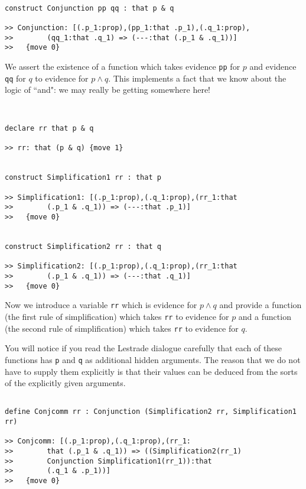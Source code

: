 \documentclass[12pt]{article}
\begin{document}
\begin{verbatim}

construct Conjunction pp qq : that p & q

>> Conjunction: [(.p_1:prop),(pp_1:that .p_1),(.q_1:prop),
>>        (qq_1:that .q_1) => (---:that (.p_1 & .q_1))]
>>   {move 0}

\end{verbatim}

We assert the existence of a function which takes evidence {\tt pp} for $p$ and evidence {\tt qq} for $q$ to evidence for $p \wedge q$.  This implements a fact that we know about the logic of ``and":  we may really be getting somewhere here!

\begin{verbatim}


declare rr that p & q

>> rr: that (p & q) {move 1}


construct Simplification1 rr : that p

>> Simplification1: [(.p_1:prop),(.q_1:prop),(rr_1:that 
>>        (.p_1 & .q_1)) => (---:that .p_1)]
>>   {move 0}


construct Simplification2 rr : that q

>> Simplification2: [(.p_1:prop),(.q_1:prop),(rr_1:that 
>>        (.p_1 & .q_1)) => (---:that .q_1)]
>>   {move 0}

\end{verbatim}

Now we introduce a variable {\tt rr} which is evidence for $p \wedge q$ and provide a function (the first rule of simplification) which takes {\tt rr}
to evidence for $p$ and a function (the second rule of simplification) which takes {\tt rr} to evidence for $q$.

You will notice if you read the Lestrade dialogue carefully that each of these functions has {\tt p} and {\tt q} as additional hidden arguments.
The reason that we do not have to supply them explicitly is that their values can be deduced from the sorts of the explicitly given arguments.

\begin{verbatim}

define Conjcomm rr : Conjunction (Simplification2 rr, Simplification1 rr)

>> Conjcomm: [(.p_1:prop),(.q_1:prop),(rr_1:
>>        that (.p_1 & .q_1)) => ((Simplification2(rr_1) 
>>        Conjunction Simplification1(rr_1)):that 
>>        (.q_1 & .p_1))]
>>   {move 0}



\end{verbatim}
\end{document}

